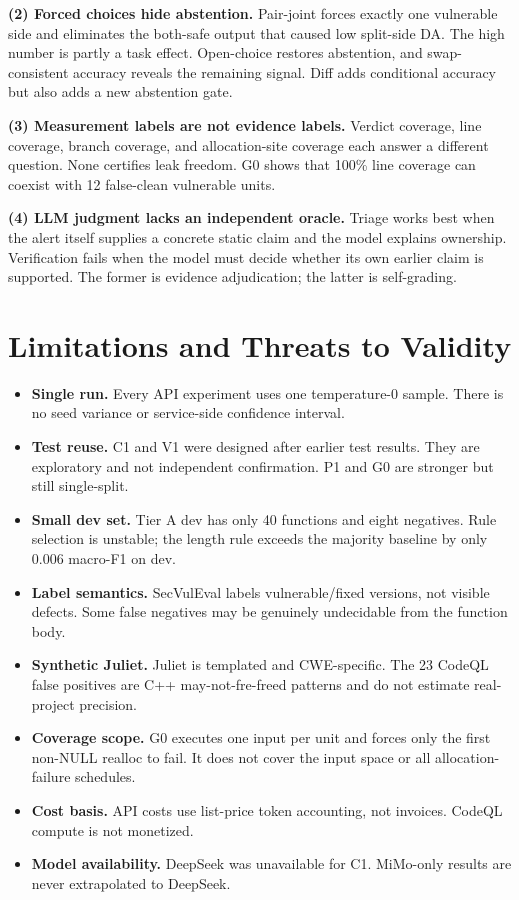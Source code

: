 \documentclass[conference]{IEEEtran}
\begin{document}
\textbf{(2) Forced choices hide abstention.} Pair-joint forces exactly one vulnerable side and eliminates the both-safe output that caused low split-side DA. The high number is partly a task effect. Open-choice restores abstention, and swap-consistent accuracy reveals the remaining signal. Diff adds conditional accuracy but also adds a new abstention gate.

\textbf{(3) Measurement labels are not evidence labels.} Verdict coverage, line coverage, branch coverage, and allocation-site coverage each answer a different question. None certifies leak freedom. G0 shows that 100\% line coverage can coexist with 12 false-clean vulnerable units.

\textbf{(4) LLM judgment lacks an independent oracle.} Triage works best when the alert itself supplies a concrete static claim and the model explains ownership. Verification fails when the model must decide whether its own earlier claim is supported. The former is evidence adjudication; the latter is self-grading.

\section{Limitations and Threats to Validity}
\label{sec:threats}

\begin{itemize}
  \item \textbf{Single run.} Every API experiment uses one temperature-0 sample. There is no seed variance or service-side confidence interval.
  \item \textbf{Test reuse.} C1 and V1 were designed after earlier test results. They are exploratory and not independent confirmation. P1 and G0 are stronger but still single-split.
  \item \textbf{Small dev set.} Tier A dev has only 40 functions and eight negatives. Rule selection is unstable; the length rule exceeds the majority baseline by only 0.006 macro-F1 on dev.
  \item \textbf{Label semantics.} SecVulEval labels vulnerable/fixed versions, not visible defects. Some false negatives may be genuinely undecidable from the function body.
  \item \textbf{Synthetic Juliet.} Juliet is templated and CWE-specific. The 23 CodeQL false positives are C++ may-not-fre-freed patterns and do not estimate real-project precision.
  \item \textbf{Coverage scope.} G0 executes one input per unit and forces only the first non-NULL realloc to fail. It does not cover the input space or all allocation-failure schedules.
  \item \textbf{Cost basis.} API costs use list-price token accounting, not invoices. CodeQL compute is not monetized.
  \item \textbf{Model availability.} DeepSeek was unavailable for C1. MiMo-only results are never extrapolated to DeepSeek.
\end{itemize}
\end{document}
